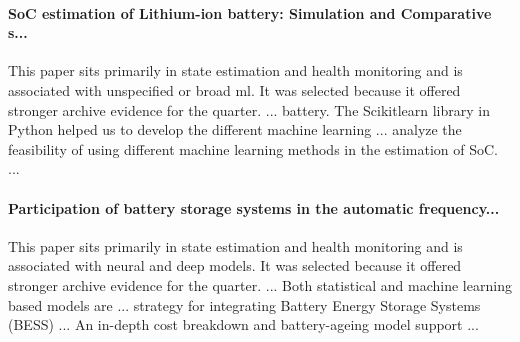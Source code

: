 \documentclass[conference]{IEEEtran}
\begin{document}
\paragraph{SoC estimation of Lithium-ion battery: Simulation and Comparative s...} This paper sits primarily in state estimation and health monitoring and is associated with unspecified or broad ml. It was selected because it offered stronger archive evidence for the quarter. ... battery. The Scikitlearn library in Python helped us to develop the different machine learning ... analyze the feasibility of using different machine learning methods in the estimation of SoC. ... \cite{socestimationof2023}

\paragraph{Participation of battery storage systems in the automatic frequency...} This paper sits primarily in state estimation and health monitoring and is associated with neural and deep models. It was selected because it offered stronger archive evidence for the quarter. ... Both statistical and machine learning based models are ... strategy for integrating Battery Energy Storage Systems (BESS) ... An in-depth cost breakdown and battery-ageing model support ... \cite{participationofbattery2020}
\end{document}
